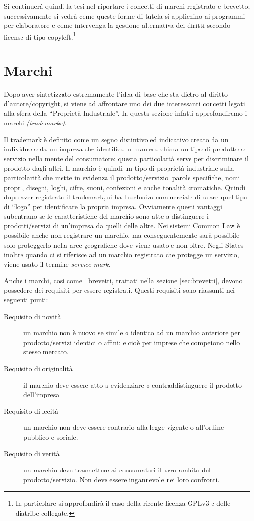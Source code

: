 Si continuerà quindi la tesi nel riportare i concetti di marchi registrato e brevetto; successivamente si vedrà come queste forme di tutela si applichino ai programmi per elaboratore e come intervenga la gestione alternativa dei diritti secondo license di tipo copyleft.\footnote{In particolare si approfondirà il caso della ricente licenza GPLv3 e delle diatribe collegate.}


\section{Marchi}
Dopo aver sintetizzato estremamente l'idea di base che sta dietro al diritto d'autore/copyright, si viene ad affrontare uno dei due interessanti concetti legati alla sfera della ``Proprietà Industriale''. In questa sezione infatti approfondiremo i marchi \textit{(trademarks)}.

Il trademark è definito come un segno distintivo ed indicativo creato da un individuo o da un impresa che identifica in maniera chiara un tipo di prodotto o servizio nella mente del consumatore: questa particolartà serve per discriminare il prodotto dagli altri. Il marchio è quindi un tipo di proprietà industriale sulla particolarità che mette in evidenza il prodotto/servizio: parole specifiche, nomi propri, disegni, loghi, cifre, suoni, confezioni e anche tonalità cromatiche. Quindi dopo aver registrato il trademark, si ha l'esclusiva commerciale di usare quel tipo di ``logo'' per identificare la propria impresa. Ovviamente questi vantaggi subentrano se le caratteristiche del marchio sono atte a distinguere i prodotti/servizi di un'impresa da quelli delle altre. Nei sistemi Common Law è possibile anche non registrare un marchio, ma conseguentemente sarà possibile solo proteggerlo nella aree geografiche dove viene usato e non oltre. Negli States inoltre quando ci si riferisce ad un marchio registrato che protegge un servizio, viene usato il termine \textit{service mark}.

Anche i marchi, così come i brevetti, trattati nella sezione \ref{sec:brevetti}, devono possedere dei requisiti per essere registrati. Questi requisiti sono riassunti nei seguenti punti:
\begin{description}
 \item[Requisito di novità] un marchio non è nuovo se simile o identico ad un marchio anteriore per prodotto/servizi identici o affini: e cioè per imprese che competono nello stesso mercato.
 \item[Requisito di originalità] il marchio deve essere atto a evidenziare o contraddistinguere il prodotto dell'impresa
 \item[Requisito di lecità] un marchio non deve essere contrario alla legge vigente o all'ordine pubblico e sociale.
 \item[Requisito di verità] un marchio deve trasmettere ai consumatori il vero ambito del prodotto/servizio. Non deve essere ingannevole nei loro confronti. 
 \end{description}

